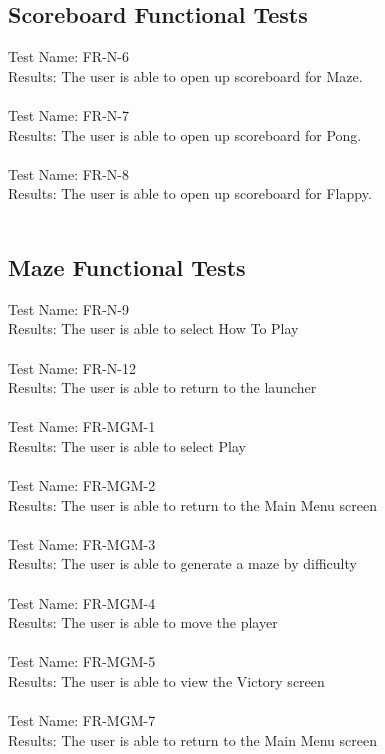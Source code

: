 \documentclass[12pt, titlepage]{article}
\begin{document}
\subsection{Scoreboard Functional Tests}
    Test Name: FR-N-6\\
	Results: The user is able to open up scoreboard for Maze.\\ \\
	Test Name: FR-N-7\\
	Results: The user is able to open up scoreboard for Pong.\\ \\
	Test Name: FR-N-8\\
	Results: The user is able to open up scoreboard for Flappy.\\ \\
	
\subsection{Maze Functional Tests}
	Test Name: FR-N-9 \\
	Results: The user is able to select How To Play \\ \\
	Test Name: FR-N-12 \\
	Results: The user is able to return to the launcher \\ \\
	Test Name: FR-MGM-1 \\
	Results: The user is able to select Play \\ \\
	Test Name: FR-MGM-2 \\
	Results: The user is able to return to the Main Menu screen\\ \\
	Test Name: FR-MGM-3 \\
	Results: The user is able to generate a maze by difficulty \\ \\ 
	Test Name: FR-MGM-4 \\ 
	Results: The user is able to move the player \\ \\
	Test Name: FR-MGM-5 \\
	Results: The user is able to view the Victory screen \\ \\
	Test Name: FR-MGM-7 \\ 
	Results: The user is able to return to the Main Menu screen\\ \\
	
\end{document}
